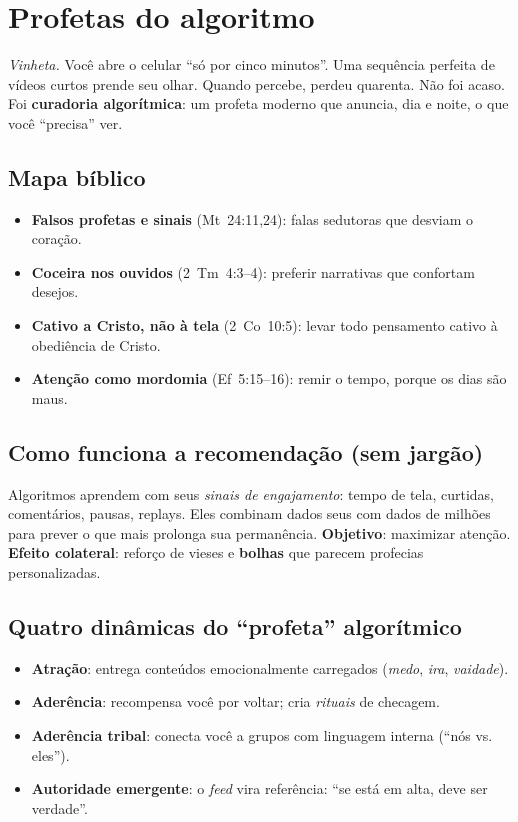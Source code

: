 \chapter{Profetas do algoritmo}
\noindent\textit{Vinheta.} Você abre o celular ``só por cinco minutos''. Uma sequência perfeita de vídeos curtos prende seu olhar. Quando percebe, perdeu quarenta. Não foi acaso. Foi \textbf{curadoria algorítmica}: um profeta moderno que anuncia, dia e noite, o que você ``precisa'' ver.

\section{Mapa bíblico}
\begin{itemize}[leftmargin=*,noitemsep]
  \item \textbf{Falsos profetas e sinais} (Mt~24:11,24): falas sedutoras que desviam o coração.
  \item \textbf{Coceira nos ouvidos} (2~Tm~4:3--4): preferir narrativas que confortam desejos.
  \item \textbf{Cativo a Cristo, não à tela} (2~Co~10:5): levar todo pensamento cativo à obediência de Cristo.
  \item \textbf{Atenção como mordomia} (Ef~5:15--16): remir o tempo, porque os dias são maus.
\end{itemize}

\section{Como funciona a recomendação (sem jargão)}
Algoritmos aprendem com seus \textit{sinais de engajamento}: tempo de tela, curtidas, comentários, pausas, replays. Eles combinam dados seus com dados de milhões para prever o que mais prolonga sua permanência. \textbf{Objetivo}: maximizar atenção. \textbf{Efeito colateral}: reforço de vieses e \textbf{bolhas} que parecem profecias personalizadas.

\section{Quatro dinâmicas do ``profeta'' algorítmico}
\begin{itemize}[leftmargin=*,noitemsep]
  \item \textbf{Atração}: entrega conteúdos emocionalmente carregados (\emph{medo}, \emph{ira}, \emph{vaidade}).
  \item \textbf{Aderência}: recompensa você por voltar; cria \emph{rituais} de checagem.
  \item \textbf{Aderência tribal}: conecta você a grupos com linguagem interna (``nós vs. eles'').
  \item \textbf{Autoridade emergente}: o \emph{feed} vira referência: ``se está em alta, deve ser verdade''.
\end{itemize}

